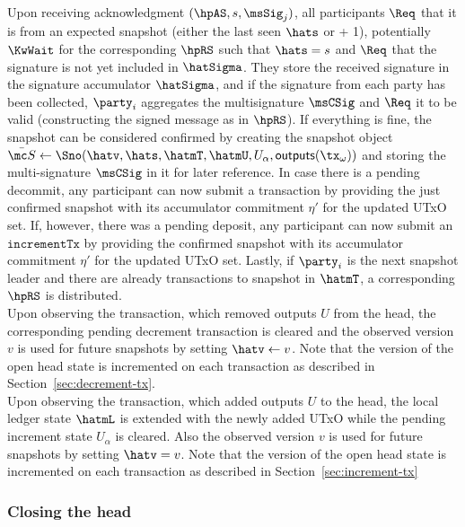 \quad Upon receiving acknowledgment $(\hpAS,s,\msSig_j)$, all
participants $\Req$ that it is from an expected snapshot (either the last seen
$\hats$ or + 1), potentially $\KwWait$ for the corresponding $\hpRS$ such that
$\hats = s$ and $\Req$ that the signature is not yet included in $\hatSigma$.
They store the received signature in the signature accumulator $\hatSigma$, and
if the signature from each party has been collected, $\party_i$ aggregates the
multisignature $\msCSig$ and $\Req$ it to be valid (constructing the signed
message as in $\hpRS$). If everything is fine, the snapshot can be considered
confirmed by creating the snapshot object
$\bar{\mc S} \gets \Sno(\hatv, \hats, \hatmT, \hatmU, U_{\alpha}, \mathsf{outputs}(\tx_{\omega}))$
and storing the multi-signature $\msCSig$ in it for later reference. In case
there is a pending decommit, any participant can now submit a \mtxDecrement{}
transaction by providing the just confirmed snapshot with its accumulator
commitment $\eta'$ for the updated UTxO set. If, however, there
was a pending deposit, any participant can now submit an $\mathtt{incrementTx}$
by providing the confirmed snapshot with its accumulator commitment $\eta'$
for the updated UTxO set. Lastly, if $\party_i$ is the next snapshot
leader and there are already transactions to snapshot in $\hatmT$, a
corresponding $\hpRS$ is distributed. \\

\quad Upon observing the \mtxDecrement{}
transaction, which removed outputs $U$ from the head, the corresponding pending
decrement transaction is cleared and the observed version $v$ is used for future
snapshots by setting $\hatv \gets v$. Note that the version of the open head state
is incremented on each \mtxDecrement{} transaction as described in
Section~\ref{sec:decrement-tx}. \\

\quad Upon observing the \mtxIncrement{}
transaction, which added outputs $U$ to the head, the local ledger state
$\hatmL$ is extended with the newly added UTxO while the pending increment
state $U_{\alpha}$ is cleared. Also the observed version $v$ is used for future
snapshots by setting $\hatv = v$. Note that the version of the open head state
is incremented on each \mtxIncrement{} transaction as described in
Section~\ref{sec:increment-tx}

\subsubsection{Closing the head}

